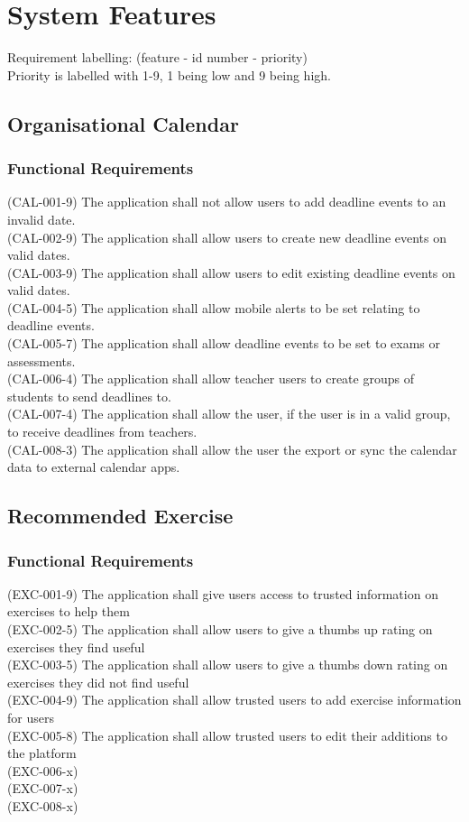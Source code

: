 \documentclass[a4paper]{article}
\begin{document}
\section {System Features}	
Requirement labelling: (feature - id number - priority)\\
Priority is labelled with 1-9, 1 being low and 9 being high.
\subsection{Organisational Calendar}
\subsubsection*{Functional Requirements}
	(CAL-001-9) The application shall not allow users to add deadline events to an invalid date.\\
	(CAL-002-9) The application shall allow users to create new deadline events on valid dates.\\
	(CAL-003-9) The application shall allow users to edit existing deadline events on valid dates.\\
	(CAL-004-5) The application shall allow mobile alerts to be set relating to deadline events.\\
	(CAL-005-7) The application shall allow deadline events to be set to exams or assessments.\\
	(CAL-006-4) The application shall allow teacher users to create groups of students to send deadlines to.\\
	(CAL-007-4) The application shall allow the user, if the user is in a valid group, to receive deadlines from teachers. \\
	(CAL-008-3) The application shall allow the user the export or sync the calendar data to external calendar apps.\\
	
\subsection{Recommended Exercise}
\subsubsection*{Functional Requirements}
	(EXC-001-9) The application shall give users access to trusted information on exercises to help them\\
	(EXC-002-5) The application shall allow users to give a thumbs up rating on exercises they find useful\\
	(EXC-003-5) The application shall allow users to give a thumbs down rating on exercises they did not find useful\\
	(EXC-004-9) The application shall allow trusted users to add exercise information for users\\
	(EXC-005-8) The application shall allow trusted users to edit their additions to the platform\\
	(EXC-006-x) \\
	(EXC-007-x) \\
	(EXC-008-x) \\
	
\end{document}
